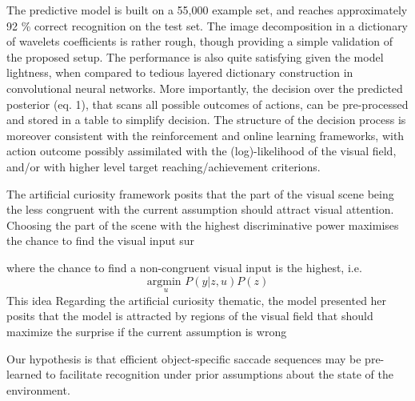 \documentclass[12pt,twoside,openright]{article}
\begin{document}
	The predictive model is built on a 55,000 example set, and reaches approximately 92 \% correct recognition on the test set. The image decomposition in a dictionary of wavelets coefficients is rather rough, though providing a simple validation of the proposed setup. The performance is also quite satisfying given the model lightness, when compared to tedious layered dictionary construction in convolutional neural networks. 
	More importantly, the decision over the predicted posterior (eq. 1), that scans all possible outcomes of actions, can be pre-processed and stored in a table to simplify decision. The structure of the decision process is moreover consistent with the reinforcement and online learning frameworks, with action outcome possibly assimilated with the (log)-likelihood of the visual field, and/or with higher level target reaching/achievement criterions.
	
	{\color{magenta} The artificial curiosity framework posits that the part of the visual scene being the less congruent with the current assumption should attract visual attention. Choosing the part of the scene with the highest discriminative power maximises the chance to find the visual input sur
		
		where the chance to find a non-congruent visual input is the highest, i.e.
		$$ \underset{u}{\text{argmin }} P(y|z,u) P(z)$$
		This idea 
		Regarding the artificial curiosity thematic, the model presented her posits that the model is attracted by regions of the visual field that should maximize the surprise if the current assumption is wrong}
	
	{\color{magenta} Our hypothesis is that efficient object-specific saccade sequences may be pre-learned to facilitate recognition under prior assumptions about the state of the environment. }
		
		
	
	
	
\begin{footnotesize}


\end{footnotesize}	
	
\end{document}
